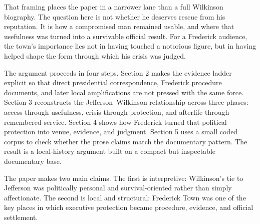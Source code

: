 That framing places the paper in a narrower lane than a full Wilkinson biography. The question here is not whether he deserves rescue from his reputation. It is how a compromised man remained usable, and where that usefulness was turned into a survivable official result. For a Frederick audience, the town's importance lies not in having touched a notorious figure, but in having helped shape the form through which his crisis was judged.

The argument proceeds in four steps. Section 2 makes the evidence ladder explicit so that direct presidential correspondence, Frederick procedure documents, and later local amplifications are not pressed with the same force. Section 3 reconstructs the Jefferson--Wilkinson relationship across three phases: access through usefulness, crisis through protection, and afterlife through remembered service. Section 4 shows how Frederick turned that political protection into venue, evidence, and judgment. Section 5 uses a small coded corpus to check whether the prose claims match the documentary pattern. The result is a local-history argument built on a compact but inspectable documentary base.

The paper makes two main claims. The first is interpretive: Wilkinson's tie to Jefferson was politically personal and survival-oriented rather than simply affectionate. The second is local and structural: Frederick Town was one of the key places in which executive protection became procedure, evidence, and official settlement.
